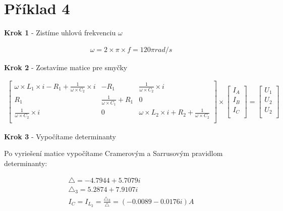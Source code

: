 \section{Příklad 4}

\begin{center}
    \textbf{Krok 1} - Zistíme uhlovú frekvenciu $\omega$
\end{center}

\begin{gather*}
    \omega = 2 \times \pi \times f = 120\pi rad/s
\end{gather*}

\begin{center}
    \textbf{Krok 2} - Zostavíme matice pre smyčky
\end{center}

\begin{gather*}
    \begin{bmatrix} 
	\omega \times L_{1} \times i - R_{1} + \frac{1}{\omega \times C_{2}} \times i & -R_{1} & \frac{1}{\omega \times C_{2}} \times i \\
	R_{1} & \frac{1}{\omega \times C_{1}} + R_{1} & 0\\
	\frac{1}{\omega \times C_{2}} \times i & 0 & \omega \times L_{2} \times i + R_{2} + \frac{1}{\omega \times C_{2}}\\
	\end{bmatrix}
    \times
    \begin{bmatrix}
    I_{A}\\
    I_{B}\\
    I_{C}\\
    \end{bmatrix}
    =
    \begin{bmatrix}
    U_{1}\\
    U_{2}\\
    U_{2}\\
    \end{bmatrix}
	\quad
\end{gather*}

\begin{center}
    \textbf{Krok 3} - Vypočítame determinanty

    Po vyriešení matice vypočítame Cramerovým a Sarrusovým pravidlom determinanty:
\end{center}

\begin{gather*}
    \triangle = -4.7944 + 5.7079i\\
    \triangle_{3} = 5.2874 + 7.9107i\\
    I_{C} = I_{L_{2}} = \frac{\triangle_{3}}{\triangle} = (-0.0089 - 0.0176i)A\\
\end{gather*}


